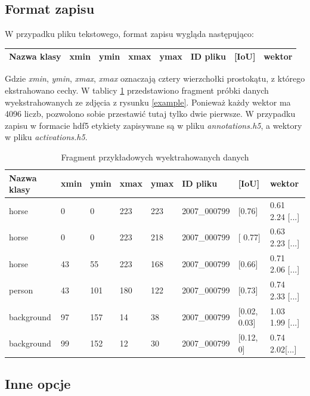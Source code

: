\documentclass[a4paper,twoside,12pt]{book}
\begin{document}
{\subsection{Format zapisu}
{W przypadku pliku tekstowego, format zapisu wygląda następująco:}

\begin{table}[h!]
\centering
\begin{tabular}{|l|l|l|l|l|l|l|l|}
\hline
Nazwa klasy  & xmin & ymin & xmax & ymax & ID pliku & [IoU] & wektor \\
\hline

\end{tabular}
\end{table}  
{Gdzie \emph{xmin}, \emph{ymin}, \emph{xmax}, \emph{xmax} oznaczają cztery wierzchołki prostokątu, z którego ekstrahowano cechy. W tablicy \ref{cechy} przedstawiono fragment próbki danych wyekstrahowanych ze zdjęcia z rysunku \ref{example}. Ponieważ każdy wektor ma 4096 liczb, pozwolono sobie przestawić tutaj tylko dwie pierwsze.}
{W przypadku zapisu w formacie hdf5 etykiety zapisywane są w pliku \emph{annotations.h5}, a wektory w pliku \emph{activations.h5}.}
\label{format}



\begin{table}[h!]
\centering
\caption{Fragment przykładowych wyektrahowanych danych}
\begin{tabular}{llllllll}
\hline
Nazwa klasy  & xmin & ymin & xmax & ymax & ID pliku & [IoU] & wektor \\
\hline
horse  & 0 & 0 & 223 & 223 & 2007\_000799 & [0.76] & 0.61 2.24 [...]\\
horse  &0 & 0 & 223 & 218 & 2007\_000799 & [ 0.77]  &0.63 2.23 [...]\\
horse &  43 & 55 & 223 & 168 & 2007\_000799 &[0.66] & 0.71 2.06 [...]\\
person &  43 & 101 & 180 & 122 & 2007\_000799 & [0.73] & 0.74 2.33 [...] \\
background & 97 & 157 & 14 & 38 & 2007\_000799 & [0.02, 0.03]& 1.03 1.99 [...]\\
background & 99 & 152 & 12 & 30 & 2007\_000799 &[0.12, 0] & 0.74 2.02[...]\\
\hline
\end{tabular}
\label{cechy}
\end{table}

\subsection{Inne opcje}
}
\end{document}
